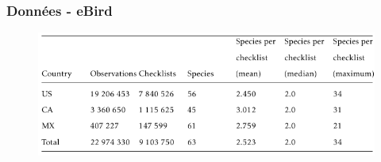 \documentclass[10pt]{beamer}
\begin{document}
\begin{frame}
  \frametitle{Données - eBird}
  \begin{figure}
    \centering
    \hspace*{-0cm}\includegraphics[scale=0.4]{fig/ebird_table.png}
  \end{figure}
\end{frame}
\end{document}
